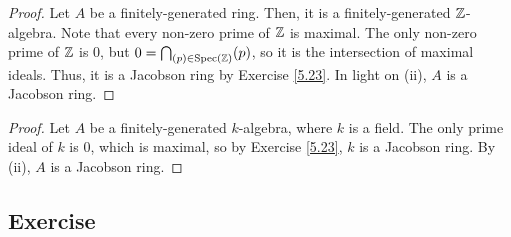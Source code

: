 \begin{proof}
Let $A$ be a finitely-generated ring. Then, it is a finitely-generated $\mathbb{Z}$-algebra. Note that every non-zero prime of $\mathbb{Z}$ is maximal. The only non-zero
prime of $\mathbb{Z}$ is $0$, but $0 = \bigcap_{(p) \in \operatorname{Spec}(\mathbb{Z})}(p)$, so it is the intersection of maximal ideals. Thus, it is a Jacobson ring by 
Exercise \ref{5.23}. In light on (ii), $A$ is a Jacobson ring.
\end{proof}

\begin{proof}
Let $A$ be a finitely-generated $k$-algebra, where $k$ is a field. The only prime ideal of $k$ is $0$, which is maximal, so by Exercise \ref{5.23},
$k$ is a Jacobson ring. By (ii), $A$ is a Jacobson ring.
\end{proof}

\subsection{Exercise}\label{5.25}

